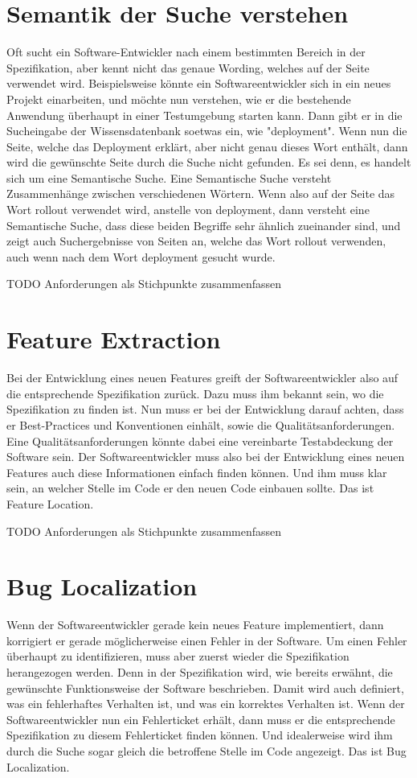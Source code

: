 \section{Semantik der Suche verstehen}
Oft sucht ein Software-Entwickler nach einem bestimmten Bereich in der Spezifikation, aber kennt nicht das genaue Wording, welches auf der Seite verwendet wird.
Beispielsweise könnte ein Softwareentwickler sich in ein neues Projekt einarbeiten, und möchte nun verstehen, wie er die bestehende Anwendung überhaupt in einer Testumgebung starten kann.
Dann gibt er in die Sucheingabe der Wissensdatenbank soetwas ein, wie "deployment".
Wenn nun die Seite, welche das Deployment erklärt, aber nicht genau dieses Wort enthält, dann wird die gewünschte Seite durch die Suche nicht gefunden.
Es sei denn, es handelt sich um eine Semantische Suche.
Eine Semantische Suche versteht Zusammenhänge zwischen verschiedenen Wörtern.
Wenn also auf der Seite das Wort rollout verwendet wird, anstelle von deployment, dann versteht eine Semantische Suche, dass diese beiden Begriffe sehr ähnlich zueinander sind, und zeigt auch Suchergebnisse von Seiten an, welche das Wort rollout verwenden, auch wenn nach dem Wort deployment gesucht wurde.

TODO Anforderungen als Stichpunkte zusammenfassen

\section{Feature Extraction}
Bei der Entwicklung eines neuen Features greift der Softwareentwickler also auf die entsprechende Spezifikation zurück.
Dazu muss ihm bekannt sein, wo die Spezifikation zu finden ist.
Nun muss er bei der Entwicklung darauf achten, dass er Best-Practices und Konventionen einhält, sowie die Qualitätsanforderungen.
Eine Qualitätsanforderungen könnte dabei eine vereinbarte Testabdeckung der Software sein.
Der Softwareentwickler muss also bei der Entwicklung eines neuen Features auch diese Informationen einfach finden können.
Und ihm muss klar sein, an welcher Stelle im Code er den neuen Code einbauen sollte.
Das ist Feature Location.

TODO Anforderungen als Stichpunkte zusammenfassen

\section{Bug Localization}
Wenn der Softwareentwickler gerade kein neues Feature implementiert, dann korrigiert er gerade möglicherweise einen Fehler in der Software.
Um einen Fehler überhaupt zu identifizieren, muss aber zuerst wieder die Spezifikation herangezogen werden.
Denn in der Spezifikation wird, wie bereits erwähnt, die gewünschte Funktionsweise der Software beschrieben.
Damit wird auch definiert, was ein fehlerhaftes Verhalten ist, und was ein korrektes Verhalten ist.
Wenn der Softwareentwickler nun ein Fehlerticket erhält, dann muss er die entsprechende Spezifikation zu diesem Fehlerticket finden können.
Und idealerweise wird ihm durch die Suche sogar gleich die betroffene Stelle im Code angezeigt.
Das ist Bug Localization.\\

